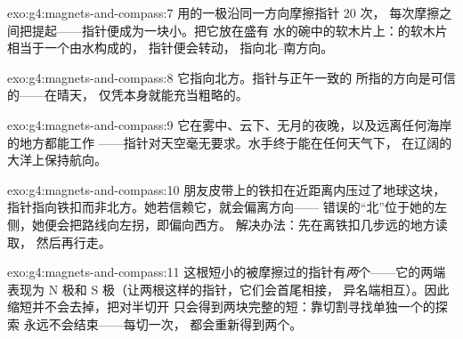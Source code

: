 \begin{solution}{exo:g4:magnets-and-compass:7}
用的一极沿同一方向摩擦指针 20 次，
每次摩擦之间把提起——指针便成为一块小。把它放在盛有
水的碗中的软木片上：的软木片相当于一个由水构成的，
指针便会转动，
指向北–南方向。
\end{solution}

\begin{solution}{exo:g4:magnets-and-compass:8}
它指向北方。指针与正午一致的
所指的方向是可信的——在晴天，
仅凭本身就能充当粗略的。
\end{solution}

\begin{solution}{exo:g4:magnets-and-compass:9}
它在雾中、云下、无月的夜晚，以及远离任何海岸的地方都能工作
——指针对天空毫无要求。水手终于能在任何天气下，
在辽阔的大洋上保持航向。
\end{solution}

\begin{solution}{exo:g4:magnets-and-compass:10}
朋友皮带上的铁扣在近距离内压过了地球这块，
指针指向铁扣而非北方。她若信赖它，就会偏离方向——
错误的“北”位于她的左侧，她便会把路线向左拐，即偏向西方。
解决办法：先在离铁扣几步远的地方读取，
然后再行走。
\end{solution}

\begin{solution}{exo:g4:magnets-and-compass:11}
这根短小的被摩擦过的指针有\emph{两}个——它的两端
表现为 N 极和 S 极（让两根这样的指针，它们会首尾相接，
异名端相互）。因此缩短并不会去掉，把对半切开
只会得到两块完整的短：靠切割寻找单独一个的探索
永远不会结束——每切一次，
都会重新得到两个。
\end{solution}
